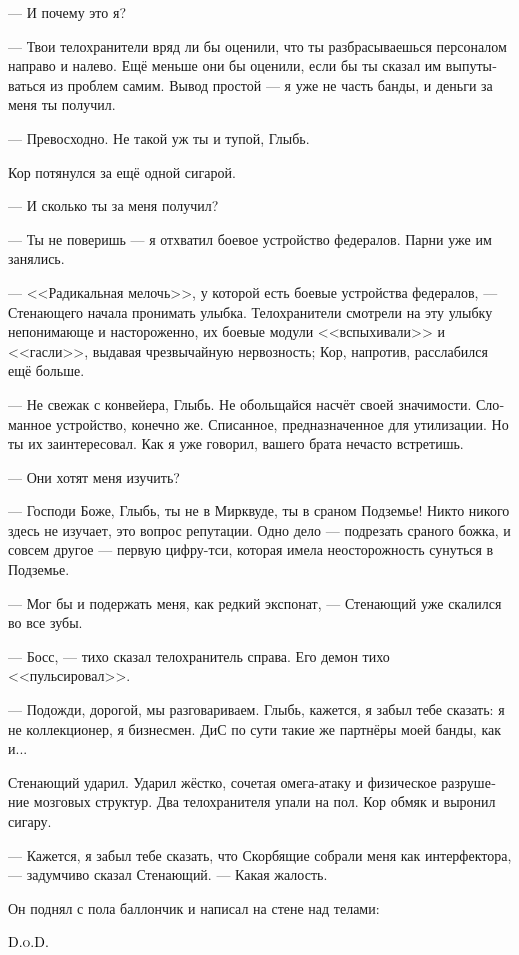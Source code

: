 \documentclass[a4paper,12pt,fleqn]{book}\usepackage{cooltooltips}\usepackage{polyglossia}\setdefaultlanguage[babelshorthands=true]{russian}\setotherlanguage{english}\defaultfontfeatures{Ligatures=TeX,Mapping=tex-text} \usepackage{xcolor}\definecolor{lightgray}{HTML}{bbbbbb}\color{lightgray}\newcommand{\ml}[3]{\textenglish{\textcolor{black}{#3}}}
\begin{document}
--- И почему это я?

--- Твои телохранители вряд ли бы оценили, что ты разбрасываешься персоналом направо и налево.
Ещё меньше они бы оценили, если бы ты сказал им выпутываться из проблем самим.
Вывод простой --- я уже не часть банды, и деньги за меня ты получил.

--- Превосходно.
Не такой уж ты и тупой, Глыбь.

Кор потянулся за ещё одной сигарой.

--- И сколько ты за меня получил?

--- Ты не поверишь --- я отхватил боевое устройство федералов.
Парни уже им занялись.

--- <<Радикальная мелочь>>, у которой есть боевые устройства федералов, --- Стенающего начала пронимать улыбка.
Телохранители смотрели на эту улыбку непонимающе и настороженно, их боевые модули <<вспыхивали>> и <<гасли>>, выдавая чрезвычайную нервозность;
Кор, напротив, расслабился ещё больше.

--- Не свежак с конвейера, Глыбь.
Не обольщайся насчёт своей значимости.
Сломанное устройство, конечно же.
Списанное, предназначенное для утилизации.
Но ты их заинтересовал.
Как я уже говорил, вашего брата нечасто встретишь.

--- Они хотят меня изучить?

--- Господи Боже, Глыбь, ты не в Мирквуде, ты в сраном Подземье!
Никто никого здесь не изучает, это вопрос репутации.
Одно дело --- подрезать сраного божка, и совсем другое --- первую цифру-тси, которая имела неосторожность сунуться в Подземье.

--- Мог бы и подержать меня, как редкий экспонат, --- Стенающий уже скалился во все зубы.

--- Босс, --- тихо сказал телохранитель справа.
Его демон тихо <<пульсировал>>.

--- Подожди, дорогой, мы разговариваем.
Глыбь, кажется, я забыл тебе сказать: я не коллекционер, я бизнесмен.
ДиС по сути такие же партнёры моей банды, как и...

Стенающий ударил.
Ударил жёстко, сочетая омега-атаку и физическое разрушение мозговых структур.
Два телохранителя упали на пол.
Кор обмяк и выронил сигару.

--- Кажется, я забыл тебе сказать, что Скорбящие собрали меня как интерфектора, --- задумчиво сказал Стенающий.
--- Какая жалость.

Он поднял с пола баллончик и написал на стене над телами:

\ml{$0$}
{Д.и.С.}
{\textsc{D.o.D.}}
\end{document}
